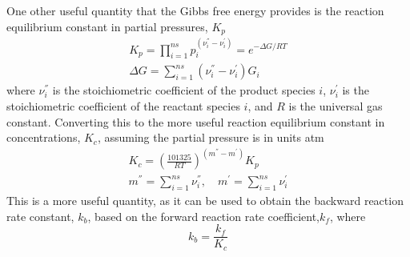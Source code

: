 \documentclass[a4paper]{article}
\begin{document}
\begin{enumerate}
    One other useful quantity that the Gibbs free energy provides is the
    reaction equilibrium constant in partial pressures, $K_p$ 
    \begin{gather}
      \boxed{K_p = 
        \prod_{i=1}^{ns}{p_i^{(\nu_i^{''}-\nu_i^{'})}} 
        = e^{-\Delta G /RT}} \label{kp-def} \\ 
      \boxed{\Delta G =
        \sum\limits_{i=1}^{ns}{\left(\nu_{i}^{''} - \nu_{i}^{'}\right) G_i}}
        \label{del-g-def} 
    \end{gather}
    where $\nu_i^{''}$ is the stoichiometric
    coefficient of the product species $i$, $\nu_i^{'}$ is the stoichiometric
    coefficient of the reactant species $i$, and $R$ is the universal gas
    constant.  Converting this to the more useful reaction equilibrium
    constant in concentrations, $K_c$, assuming the partial pressure is in
    units atm 
    \begin{equation} 
      \begin{gathered} 
        K_c = \left( \frac{101325}{RT}
        \right)^{(m^{''}-m^{'})} K_p \\
        m^{''} = 
        \sum\limits_{i=1}^{ns}{\nu_i^{''}}, \quad m^{'} =
        \sum\limits_{i=1}^{ns}{\nu_i^{'}} 
      \end{gathered} 
      \label{kc-def}
    \end{equation}
    This is a more useful quantity, as it can be used to obtain
    the backward reaction rate constant, $k_b$, based on the forward reaction
    rate coefficient,$k_f$, where 
    \begin{equation} 
      k_b = \frac{k_f}{K_c}
      \label{kb-def} 
    \end{equation}




\end{enumerate}
\end{document}
